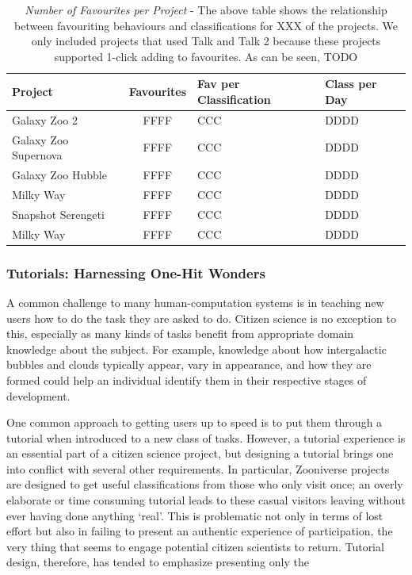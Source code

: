 \documentclass{sigchi}
\begin{document}
\begin{table}
\begin{center}
\small
\begin{tabular}{lcll}
\hline
Project & Favourites & Fav per Classification & Class per Day \\
\hline
\hline
Galaxy Zoo 2 & FFFF & CCC & DDDD \\
Galaxy Zoo Supernova & FFFF & CCC & DDDD \\
Galaxy Zoo Hubble & FFFF & CCC & DDDD \\
Milky Way & FFFF & CCC & DDDD \\
Snapshot Serengeti & FFFF & CCC & DDDD \\
Milky Way & FFFF & CCC & DDDD \\
\hline
\end{tabular}
\caption{\emph{Number of Favourites per Project} - The above table shows the relationship between favouriting behaviours and classifications for XXX of the projects.  We only included projects that used Talk and Talk 2 because these projects supported 1-click adding to favourites. As can be seen, TODO }
\label{tbl:favourites}
\normalsize
\end{center}
\end{table}


\subsubsection{Tutorials: Harnessing One-Hit Wonders}

A common challenge to many human-computation systems is in teaching new users how to do the task they are asked to do.  Citizen science is no exception to this, especially as many kinds of tasks benefit from appropriate domain knowledge about the subject.  For example, knowledge about how intergalactic bubbles and clouds typically appear, vary in appearance, and how they are formed could help an individual identify them in their respective stages of development. 

One common approach to getting users up to speed is to put them through a tutorial when introduced to a new class of tasks.  However, a tutorial experience is an essential part of a citizen science project, but designing a tutorial brings one into conflict with several other requirements. In particular, Zooniverse projects are designed to get useful classifications from those who only visit once; an overly elaborate or time consuming tutorial leads to these casual visitors leaving without ever having done anything `real'. This is problematic not only in terms of lost effort but also in failing to present an authentic experience of participation, the very thing that seems to engage potential citizen scientists to return. Tutorial design, therefore, has tended to emphasize presenting only the 
\end{document}
